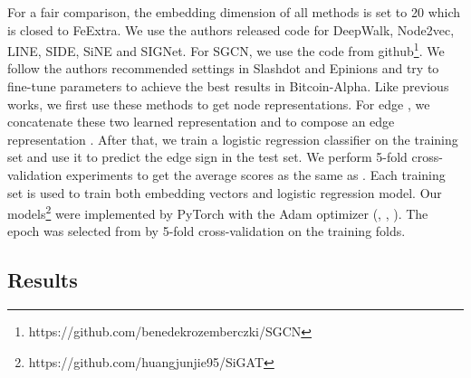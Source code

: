 \documentclass[runningheads]{llncs}
\begin{document}
For a fair comparison, the embedding dimension  of all methods is set to 20 which is closed to FeExtra\cite{leskovec2010predicting}.
We use the authors released code for DeepWalk, Node2vec, LINE, SIDE, SiNE and SIGNet. For SGCN, we use the code from github\footnote{https://github.com/benedekrozemberczki/SGCN}. 
We follow the authors recommended settings in Slashdot and Epinions and try to fine-tune parameters to achieve the best results in Bitcoin-Alpha.
Like previous works\cite{kim2018side, wang2017signed, derr2018signed}, we first use these methods to get node representations. 
For edge , we concatenate these two learned representation  and  to compose an edge representation . 
After that, we train a logistic regression classifier on the training set and use it to predict the edge sign in the test set. 
We perform 5-fold cross-validation experiments to get the average scores as the same as \cite{kim2018side}. 
Each training set is used to train both embedding vectors and logistic regression model.
Our models\footnote{https://github.com/huangjunjie95/SiGAT} were implemented by PyTorch with the Adam optimizer (, , ). 
The epoch was selected from  by 5-fold cross-validation on the training folds.

\subsection{Results}
\end{document}
